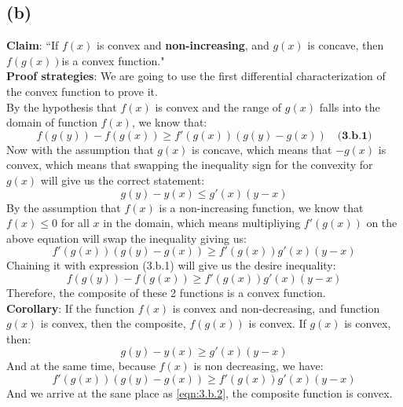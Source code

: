 \documentclass[]{article}
\begin{document}
\subsection*{(b)}
    \textbf{Claim}:  ``If $f(x)$ is convex and \textbf{non-increasing}, and $g(x)$ is concave, then $f(g(x)) $is a convex function."
    \\[.5em]
    \textbf{Proof strategies}: We are going to use the first differential characterization of the convex function to prove it.
    \\[.5em]
    By the hypothesis that $f(x)$ is convex and the range of $g(x)$ falls into the domain of function $f(x)$, we know that:
    $$
    f(g(y)) - f(g(x)) \ge f'(g(x))(g(y) - g(x)) \quad \textbf{(3.b.1)}
    $$
    Now with the assumption that $g(x)$ is concave, which means that $-g(x)$ is convex, which means that swapping the inequality sign for the convexity for $g(x)$ will give us the correct statement:
    $$
    g(y) - y(x) \le g'(x)(y - x)
    $$
    By the assumption that $f(x)$ is a non-increasing function, we know that $f(x) \le 0$ for all $x$ in the domain, which means multipliying $f'(g(x))$ on the above equation will swap the inequality giving us:
    \begin{equation}\tag{3.b.2}\label{eqn:3.b.2}
        f'(g(x)) (g(y) - g(x)) \ge f'(g(x))g'(x)(y - x)
    \end{equation}
    Chaining it with expression (3.b.1) will give us the desire inequality:
    $$
    f(g(y)) - f(g(x)) \ge f'(g(x))g'(x)(y - x)
    $$
    Therefore, the composite of these 2 functions is a convex function.
    \\
    \textbf{Corollary}: If the function $f(x)$ is convex and non-decreasing, and function $g(x)$ is convex, then the composite, $f(g(x))$ is convex. If $g(x)$ is convex, then:
    $$
    g(y) - y(x) \ge g'(x)(y - x)
    $$
    And at the same time, because $f(x)$ is non decreasing, we have:
    $$
    f'(g(x)) (g(y) - g(x)) \ge f'(g(x))g'(x)(y - x)
    $$
    And we arrive at the sane place as \ref{eqn:3.b.2}, the composite function is convex.
\end{document}
